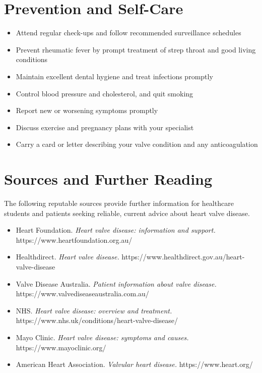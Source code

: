 \section*{Prevention and Self-Care}
\begin{itemize}
    \item Attend regular check-ups and follow recommended surveillance schedules
    \item Prevent rheumatic fever by prompt treatment of strep throat and good living conditions
    \item Maintain excellent dental hygiene and treat infections promptly
    \item Control blood pressure and cholesterol, and quit smoking
    \item Report new or worsening symptoms promptly
    \item Discuss exercise and pregnancy plans with your specialist
    \item Carry a card or letter describing your valve condition and any anticoagulation
\end{itemize}

\section*{Sources and Further Reading}
The following reputable sources provide further information for healthcare students and patients seeking reliable, current advice about heart valve disease.

\begin{itemize}
    \item Heart Foundation. \textit{Heart valve disease: information and support.} https://www.heartfoundation.org.au/
    \item Healthdirect. \textit{Heart valve disease.} https://www.healthdirect.gov.au/heart-valve-disease
    \item Valve Disease Australia. \textit{Patient information about valve disease.} https://www.valvediseaseaustralia.com.au/
    \item NHS. \textit{Heart valve disease: overview and treatment.} https://www.nhs.uk/conditions/heart-valve-disease/
    \item Mayo Clinic. \textit{Heart valve disease: symptoms and causes.} https://www.mayoclinic.org/
    \item American Heart Association. \textit{Valvular heart disease.} https://www.heart.org/
\end{itemize}
